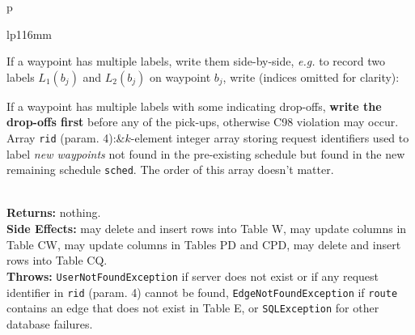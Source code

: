 \begin{tabular}{p{\textwidth}}
\begin{tabular}{lp{116mm}}

If a waypoint has multiple labels, write them side-by-side, \textit{e.g.}
to record two labels $L_1(b_j)$ and $L_2(b_j)$ on waypoint $b_j$, write
(indices omitted for clarity):


If a waypoint has multiple labels with some indicating drop-offs, \textbf{write
the drop-offs first} before any of the pick-ups, otherwise C98 violation may
occur.\\
Array {\tt{}rid} (param. 4):&$k$-element integer array storing request identifiers
used to label \emph{new waypoints} not found in the pre-existing schedule but
found in the new remaining schedule {\tt{}sched}. The order of this array doesn't
matter.
\end{tabular}\\
\textbf{Returns:} nothing.\\
\textbf{Side Effects:} may delete and insert rows into Table W, may
update columns in Table CW, may update columns in Tables PD and CPD,
may delete and insert rows into Table CQ.\\
\textbf{Throws:} {\tt{}UserNotFoundException} if server does not exist or if
any request identifier in {\tt{}rid} (param. 4) cannot be found,
{\tt{}EdgeNotFoundException} if {\tt{}route} contains an edge that does not exist
in Table E, or {\tt{}SQLException} for other database failures.\\
\bottomrule
\end{tabular}
\nwenddocs{}\endmoddef{}
